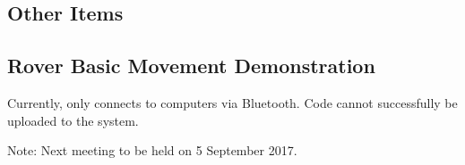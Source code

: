 \documentclass[11pt, a4paper]{article}
\begin{document}
\begin{flushleft}
  \section{Other Items}
  \subsection{Rover Basic Movement Demonstration}
  Currently, only connects to computers via Bluetooth. Code cannot successfully be uploaded to the system.
       
\end{flushleft}
  \vspace*{10pt}
  \noindent Note: Next meeting to be held on 5 September 2017.




  
\end{document}
